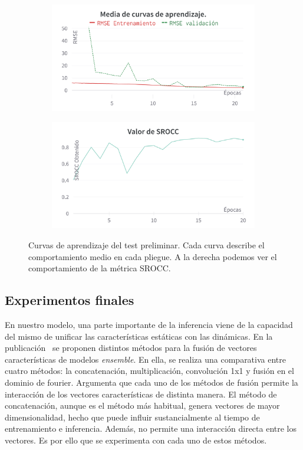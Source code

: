 \begin{figure}[htp]
  \begin{subfigure}[b]{0.49\textwidth}
  \centering
    \includegraphics[width=\textwidth]{imagenes/chapter5/PreTestCurves.png}
  \end{subfigure}
  \begin{subfigure}[b]{0.49\textwidth}
  \centering
    \includegraphics[width=\textwidth]{imagenes/chapter5/PreTestSROCC.png}
  \end{subfigure}
  \caption[Curvas de aprendizaje del test preliminar.]{Curvas de aprendizaje del test preliminar. 
  Cada curva describe el comportamiento medio en cada pliegue. A la derecha 
  podemos ver el comportamiento de la métrica SROCC.
} \label{fig:PreTestCurves}
\end{figure}

\subsection{Experimentos finales}
En nuestro modelo, una parte importante de la inferencia viene de la capacidad del mismo de unificar las características 
estáticas con las dinámicas. En la publicación~\cite{EnsemblePCQA} se proponen distintos métodos para la fusión
de vectores características de modelos \emph{ensemble}.
En ella, se realiza una comparativa entre cuatro métodos: la concatenación, multiplicación, convolución 1x1 y 
fusión en el dominio de fourier. 
Argumenta que cada uno de los métodos de fusión permite la interacción de los vectores 
características de distinta manera. El método de concatenación, aunque es el método 
más habitual, genera vectores de mayor dimensionalidad, hecho que puede influir 
sustancialmente al tiempo de entrenamiento e inferencia. Además, no permite una interacción directa entre los vectores. 
Es por ello que se experimenta con cada uno de estos métodos.  

